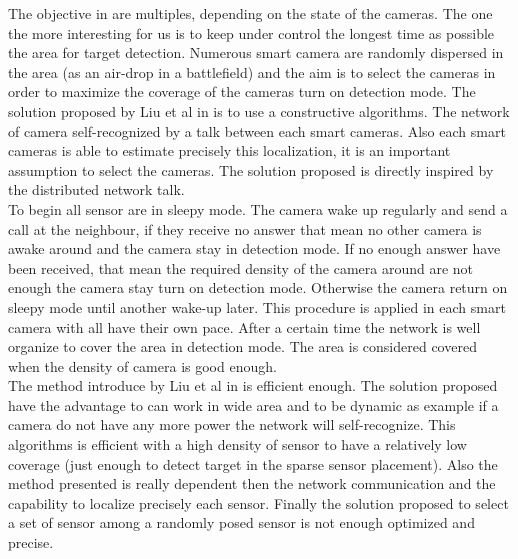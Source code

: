 The objective in \cite{38*liu2010} are multiples, depending on the state of the cameras. The one the more interesting for us is to keep under control the longest time as possible the area for target detection. Numerous smart camera are randomly dispersed in the area (as an air-drop in a battlefield) and the aim is to select the cameras in order to maximize the coverage of the cameras turn on detection mode. The solution proposed by Liu et al in \cite{38*liu2010} is to use a constructive algorithms. The network of camera self-recognized  by a talk between each smart cameras. Also each smart cameras is able to estimate precisely this localization, it is an important assumption to select the cameras. The solution proposed is directly inspired by the distributed network talk. \\
To begin all sensor are in sleepy mode. The camera wake up regularly and send a call at the neighbour, if they receive no answer that mean no other camera is awake around and the camera stay in detection mode. If no enough answer have been received, that mean the required density of the camera around are not enough the camera stay turn on detection mode. Otherwise the camera return on sleepy mode until another wake-up later. This procedure is applied in each smart camera with all have their own pace. After a certain time the network is well organize to cover the area in detection mode. The area is considered covered when the density of camera is good enough. \\
 The method introduce by Liu et al in \cite{38*liu2010} is efficient enough. The solution proposed have the advantage to can work in wide area and to be dynamic as example if a camera do not have any more power the network will self-recognize.  
This algorithms is efficient with a high density of sensor to have a relatively low coverage (just enough to detect target in the sparse sensor placement). Also the method presented is really dependent then the network communication and the capability to localize precisely each sensor. Finally the solution proposed to select a set of sensor among a randomly posed sensor is not enough optimized and precise.

